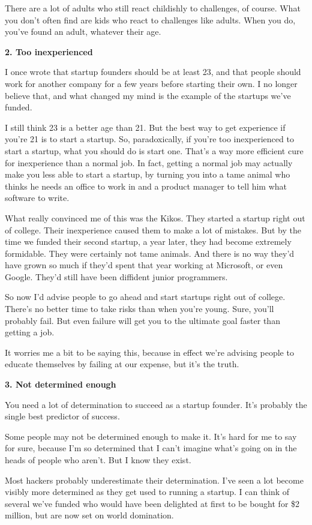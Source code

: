 There are a lot of adults who still react childishly to challenges, of
course. What you don't often find are kids who react to challenges like
adults. When you do, you've found an adult, whatever their age.

\textbf{2. Too inexperienced}

I once wrote that startup founders should be at least 23, and that
people should work for another company for a few years before starting
their own. I no longer believe that, and what changed my mind is the
example of the startups we've funded.

I still think 23 is a better age than 21. But the best way to get
experience if you're 21 is to start a startup. So, paradoxically, if
you're too inexperienced to start a startup, what you should do is start
one. That's a way more efficient cure for inexperience than a normal
job. In fact, getting a normal job may actually make you less able to
start a startup, by turning you into a tame animal who thinks he needs
an office to work in and a product manager to tell him what software to
write.

What really convinced me of this was the Kikos. They started a startup
right out of college. Their inexperience caused them to make a lot of
mistakes. But by the time we funded their second startup, a year later,
they had become extremely formidable. They were certainly not tame
animals. And there is no way they'd have grown so much if they'd spent
that year working at Microsoft, or even Google. They'd still have been
diffident junior programmers.

So now I'd advise people to go ahead and start startups right out of
college. There's no better time to take risks than when you're young.
Sure, you'll probably fail. But even failure will get you to the
ultimate goal faster than getting a job.

It worries me a bit to be saying this, because in effect we're advising
people to educate themselves by failing at our expense, but it's the
truth.

\textbf{3. Not determined enough}

You need a lot of determination to succeed as a startup founder. It's
probably the single best predictor of success.

Some people may not be determined enough to make it. It's hard for me to
say for sure, because I'm so determined that I can't imagine what's
going on in the heads of people who aren't. But I know they exist.

Most hackers probably underestimate their determination. I've seen a lot
become visibly more determined as they get used to running a startup. I
can think of several we've funded who would have been delighted at first
to be bought for \$2 million, but are now set on world domination.

